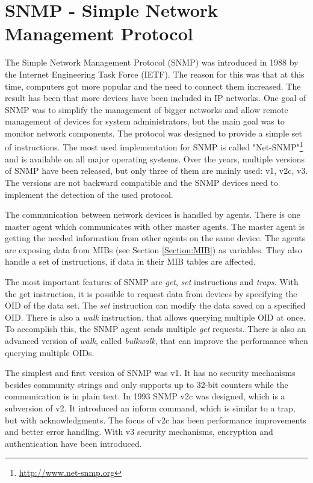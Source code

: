 \section{SNMP - Simple Network Management Protocol}
\label{Section:SNMP}

The Simple Network Management Protocol (SNMP) was introduced in 1988 by the  Internet Engineering Task Force (IETF). The reason for this was that at this time, computers got more popular and the need to connect them increased. The result has been that more devices have been included in IP networks. One goal of SNMP was to simplify the management of bigger networks and allow remote management of devices for system administrators, but the main goal was to monitor network components. The protocol was designed to provide a simple set of instructions. The most used implementation for SNMP is called "Net-SNMP"\footnote{\url{http://www.net-snmp.org}} and is available on all major operating systems. Over the years, multiple versions of SNMP have been released, but only three of them are mainly used: v1, v2c, v3. The versions are not backward compatible and the SNMP devices need to implement the detection of the used protocol.

\newpage
The communication between network devices is handled by agents. There is one master agent which communicates with other master agents. The master agent is getting the needed information from other agents on the same device. The agents are exposing data from MIBs (see Section \ref{Section:MIB}) as variables. They also handle a set of instructions, if data in their MIB tables are affected.

The most important features of SNMP are \textit{get}, \textit{set} instructions and \textit{traps}. With the get instruction, it is possible to request data from devices by specifying the OID of the data set. The \textit{set} instruction can modify the data saved on a specified OID. There is also a \textit{walk} instruction, that allows querying multiple OID at once. To accomplish this, the SNMP agent sends multiple \textit{get} requests. There is also an advanced version of \textit{walk}, called \textit{bulkwalk}, that can improve the performance when querying multiple OIDs.

The simplest and first version of SNMP was v1. It has no security mechanisms besides community strings and only supports up to 32-bit counters while the communication is in plain text. In 1993 SNMP v2c was designed, which is a subversion of v2. It introduced an inform command, which is similar to a trap, but with acknowledgments. The focus of v2c has been performance improvements and better error handling. With v3 security mechanisms, encryption and authentication have been introduced.


